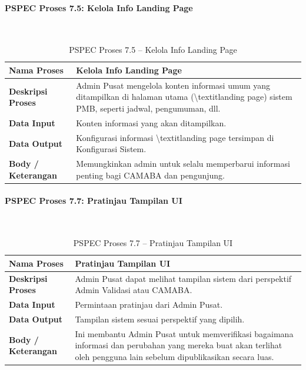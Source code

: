 \paragraph{PSPEC Proses 7.5: Kelola Info Landing Page}~\\
\begin{longtable}{|p{}|p{}|}
	\caption{PSPEC Proses 7.5 -- Kelola Info Landing Page}
	\label{table:3.pspec75}\\
	\hline
	\textbf{Nama Proses} & Kelola Info Landing Page \\
	\hline
	\textbf{Deskripsi Proses} & Admin Pusat mengelola konten informasi umum yang ditampilkan di halaman utama (\textbackslash{}textit{landing page}) sistem PMB, seperti jadwal, pengumuman, dll. \\
	\hline
	\textbf{Data Input} & Konten informasi yang akan ditampilkan. \\
	\hline
	\textbf{Data Output} & Konfigurasi informasi \textbackslash{}textit{landing page} tersimpan di Konfigurasi Sistem. \\
	\hline
	\textbf{Body / Keterangan} & Memungkinkan admin untuk selalu memperbarui informasi penting bagi CAMABA dan pengunjung. \\
	\hline
\end{longtable}

\paragraph{PSPEC Proses 7.7: Pratinjau Tampilan UI}~\\
\begin{longtable}{|p{}|p{}|}
	\caption{PSPEC Proses 7.7 -- Pratinjau Tampilan UI}
	\label{table:3.pspec77}\\
	\hline
	\textbf{Nama Proses} & Pratinjau Tampilan UI \\
	\hline
	\textbf{Deskripsi Proses} & Admin Pusat dapat melihat tampilan sistem dari perspektif Admin Validasi atau CAMABA. \\
	\hline
	\textbf{Data Input} & Permintaan pratinjau dari Admin Pusat. \\
	\hline
	\textbf{Data Output} & Tampilan sistem sesuai perspektif yang dipilih. \\
	\hline
	\textbf{Body / Keterangan} & Ini membantu Admin Pusat untuk memverifikasi bagaimana informasi dan perubahan yang mereka buat akan terlihat oleh pengguna lain sebelum dipublikasikan secara luas. \\
	\hline
\end{longtable}
